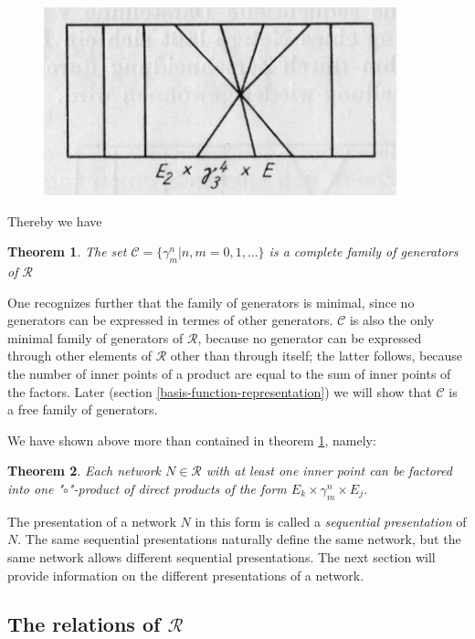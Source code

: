 \documentclass{article}
\newtheorem{theorem}{Theorem}
\begin{document}
\begin{figure}
\includegraphics[]{figure9.png}
  \centering
\caption{}
\label{fig:figure9}
\end{figure}

Thereby we have

\begin{theorem}
\label{eq:th2}
The set $\mathcal{C} = \{ \gamma_m^n | n, m = 0, 1, \ldots \}$ is a complete family of generators of $\mathcal{R}$
\end{theorem}

One recognizes further that the family of generators is minimal, since no generators can be expressed in termes of other generators. $\mathcal{C}$ is also the only minimal family of generators of $\mathcal{R}$, because no generator can be expressed through other elements of $\mathcal{R}$ other than through itself; the latter follows, because the number of inner points of a product are equal to the sum of inner points of the factors. Later (section \ref{basis-function-representation}) we will show that $\mathcal{C}$ is
a free family of generators.

We have shown above more than contained in theorem \ref{eq:th2}, namely:

\begin{theorem}
Each network $N \in \mathcal{R}$ with at least one inner point can be factored into one "$\circ$"-product of direct products of the form $E_k \times \gamma_m^n \times E_j$.
\end{theorem}

The presentation of a network $N$ in this form is called a \emph{sequential presentation} of $N$. The same sequential presentations naturally define the same network, but the same network allows different sequential presentations. The next section will provide information on the different presentations of a network.

\subsection{The relations of $\mathcal{R}$}
\label{the-relations-of-R}
\end{document}
